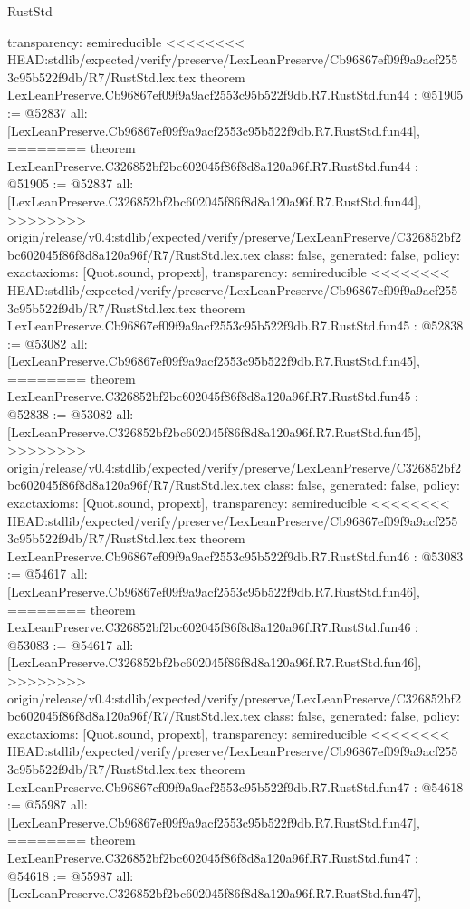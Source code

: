 \begin{lexlean}{RustStd}
\begin{coremodule}
{\begin{coremodule}
{{{{{{{{{{{{{{{{{{{{{{{{{{{{{{{{{{{{{{{{{{{{{{{  transparency: semireducible
}
<<<<<<<< HEAD:stdlib/expected/verify/preserve/LexLeanPreserve/Cb96867ef09f9a9acf2553c95b522f9db/R7/RustStd.lex.tex
theorem LexLeanPreserve.Cb96867ef09f9a9acf2553c95b522f9db.R7.RustStd.fun44 : @51905 := @52837 {
  all: [LexLeanPreserve.Cb96867ef09f9a9acf2553c95b522f9db.R7.RustStd.fun44],
========
theorem LexLeanPreserve.C326852bf2bc602045f86f8d8a120a96f.R7.RustStd.fun44 : @51905 := @52837 {
  all: [LexLeanPreserve.C326852bf2bc602045f86f8d8a120a96f.R7.RustStd.fun44],
>>>>>>>> origin/release/v0.4:stdlib/expected/verify/preserve/LexLeanPreserve/C326852bf2bc602045f86f8d8a120a96f/R7/RustStd.lex.tex
  class: false,
  generated: false,
  policy: exact{axioms: [Quot.sound, propext]},
  transparency: semireducible
}
<<<<<<<< HEAD:stdlib/expected/verify/preserve/LexLeanPreserve/Cb96867ef09f9a9acf2553c95b522f9db/R7/RustStd.lex.tex
theorem LexLeanPreserve.Cb96867ef09f9a9acf2553c95b522f9db.R7.RustStd.fun45 : @52838 := @53082 {
  all: [LexLeanPreserve.Cb96867ef09f9a9acf2553c95b522f9db.R7.RustStd.fun45],
========
theorem LexLeanPreserve.C326852bf2bc602045f86f8d8a120a96f.R7.RustStd.fun45 : @52838 := @53082 {
  all: [LexLeanPreserve.C326852bf2bc602045f86f8d8a120a96f.R7.RustStd.fun45],
>>>>>>>> origin/release/v0.4:stdlib/expected/verify/preserve/LexLeanPreserve/C326852bf2bc602045f86f8d8a120a96f/R7/RustStd.lex.tex
  class: false,
  generated: false,
  policy: exact{axioms: [Quot.sound, propext]},
  transparency: semireducible
}
<<<<<<<< HEAD:stdlib/expected/verify/preserve/LexLeanPreserve/Cb96867ef09f9a9acf2553c95b522f9db/R7/RustStd.lex.tex
theorem LexLeanPreserve.Cb96867ef09f9a9acf2553c95b522f9db.R7.RustStd.fun46 : @53083 := @54617 {
  all: [LexLeanPreserve.Cb96867ef09f9a9acf2553c95b522f9db.R7.RustStd.fun46],
========
theorem LexLeanPreserve.C326852bf2bc602045f86f8d8a120a96f.R7.RustStd.fun46 : @53083 := @54617 {
  all: [LexLeanPreserve.C326852bf2bc602045f86f8d8a120a96f.R7.RustStd.fun46],
>>>>>>>> origin/release/v0.4:stdlib/expected/verify/preserve/LexLeanPreserve/C326852bf2bc602045f86f8d8a120a96f/R7/RustStd.lex.tex
  class: false,
  generated: false,
  policy: exact{axioms: [Quot.sound, propext]},
  transparency: semireducible
}
<<<<<<<< HEAD:stdlib/expected/verify/preserve/LexLeanPreserve/Cb96867ef09f9a9acf2553c95b522f9db/R7/RustStd.lex.tex
theorem LexLeanPreserve.Cb96867ef09f9a9acf2553c95b522f9db.R7.RustStd.fun47 : @54618 := @55987 {
  all: [LexLeanPreserve.Cb96867ef09f9a9acf2553c95b522f9db.R7.RustStd.fun47],
========
theorem LexLeanPreserve.C326852bf2bc602045f86f8d8a120a96f.R7.RustStd.fun47 : @54618 := @55987 {
  all: [LexLeanPreserve.C326852bf2bc602045f86f8d8a120a96f.R7.RustStd.fun47],
}}}}}}}}}}}}}}}}}}}}}}}}}}}}}}}}}}}}}}}}}}}}}}}}}}}
\end{coremodule}}
\end{coremodule}
\end{lexlean}
